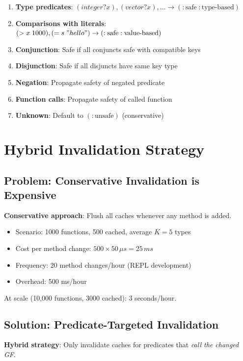 \documentclass[sigplan,review,anonymous]{acmart}
\begin{document}
\begin{enumerate}
\item \textbf{Type predicates}: $(integer? x), (vector? x), \ldots \to (\mathrm{:safe} \; \mathrm{:type\text{-}based})$
\item \textbf{Comparisons with literals}: $(> x \; 1000), (= s \; "hello") \to (\mathrm{:safe} \; \mathrm{:value\text{-}based})$
\item \textbf{Conjunction}: Safe if all conjuncts safe with compatible keys
\item \textbf{Disjunction}: Safe if all disjuncts have same key type
\item \textbf{Negation}: Propagate safety of negated predicate
\item \textbf{Function calls}: Propagate safety of called function
\item \textbf{Unknown}: Default to $(\mathrm{:unsafe})$ (conservative)
\end{enumerate}

\section{Hybrid Invalidation Strategy}

\subsection{Problem: Conservative Invalidation is Expensive}

\textbf{Conservative approach}: Flush all caches whenever any method is added.

\begin{itemize}
\item Scenario: 1000 functions, 500 cached, average $K=5$ types
\item Cost per method change: $500 \times 50\,\mu s = 25\,ms$
\item Frequency: 20 method changes/hour (REPL development)
\item Overhead: 500 ms/hour
\end{itemize}

At scale (10,000 functions, 3000 cached): 3 seconds/hour.

\subsection{Solution: Predicate-Targeted Invalidation}

\textbf{Hybrid strategy}: Only invalidate caches for predicates that \emph{call the changed GF}.
\end{document}
